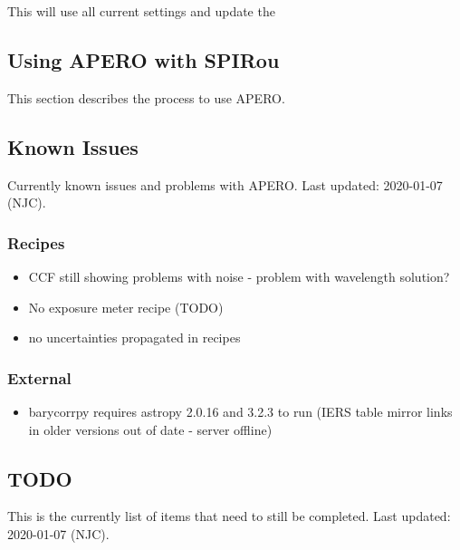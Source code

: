 \documentclass[a4paper,10pt,english]{report}
\begin{document}
This will use all current settings and update the


\subsection{Using APERO with SPIRou}
\label{\detokenize{user/general/using_apero_default:using-apero-with-spirou}}\label{\detokenize{user/general/using_apero_default:using-apero-default}}\label{\detokenize{user/general/using_apero_default::doc}}
This section describes the process to use APERO.


\subsection{Known Issues}
\label{\detokenize{user/general/known_issues:known-issues}}\label{\detokenize{user/general/known_issues:id1}}\label{\detokenize{user/general/known_issues::doc}}
Currently known issues and problems with APERO.
Last updated: 2020-01-07 (NJC).


\subsubsection{Recipes}
\label{\detokenize{user/general/known_issues:recipes}}\begin{itemize}
\item {} 
CCF still showing problems with noise - problem with wavelength solution?

\item {} 
No exposure meter recipe (TODO)

\item {} 
no uncertainties propagated in recipes

\end{itemize}


\subsubsection{External}
\label{\detokenize{user/general/known_issues:external}}\begin{itemize}
\item {} 
barycorrpy requires astropy 2.0.16 and 3.2.3 to run (IERS table mirror links
in older versions out of date - server offline)

\end{itemize}


\subsection{TODO}
\label{\detokenize{user/general/todo:todo}}\label{\detokenize{user/general/todo:id1}}\label{\detokenize{user/general/todo::doc}}
This is the currently list of items that need to still be completed.
Last updated: 2020-01-07 (NJC).
\end{document}
